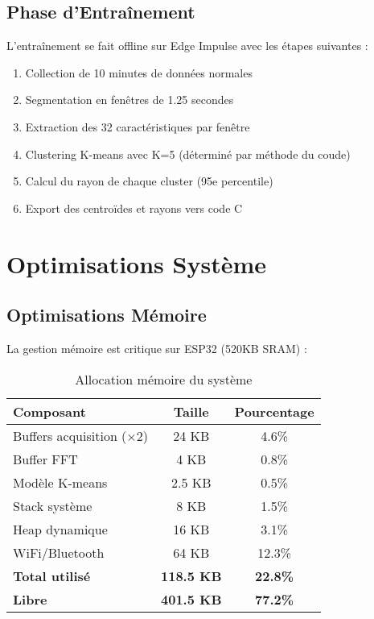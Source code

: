 \subsection{Phase d'Entraînement}

L'entraînement se fait offline sur Edge Impulse avec les étapes suivantes :

\begin{enumerate}
    \item Collection de 10 minutes de données normales
    \item Segmentation en fenêtres de 1.25 secondes
    \item Extraction des 32 caractéristiques par fenêtre
    \item Clustering K-means avec K=5 (déterminé par méthode du coude)
    \item Calcul du rayon de chaque cluster (95e percentile)
    \item Export des centroïdes et rayons vers code C
\end{enumerate}

\section{Optimisations Système}

\subsection{Optimisations Mémoire}

La gestion mémoire est critique sur ESP32 (520KB SRAM) :

\begin{table}[h]
\centering
\caption{Allocation mémoire du système}
\begin{tabular}{lcc}
\toprule
\textbf{Composant} & \textbf{Taille} & \textbf{Pourcentage} \\
\midrule
Buffers acquisition (×2) & 24 KB & 4.6\% \\
Buffer FFT & 4 KB & 0.8\% \\
Modèle K-means & 2.5 KB & 0.5\% \\
Stack système & 8 KB & 1.5\% \\
Heap dynamique & 16 KB & 3.1\% \\
WiFi/Bluetooth & 64 KB & 12.3\% \\
\midrule
\textbf{Total utilisé} & \textbf{118.5 KB} & \textbf{22.8\%} \\
\textbf{Libre} & \textbf{401.5 KB} & \textbf{77.2\%} \\
\bottomrule
\end{tabular}
\end{table}

